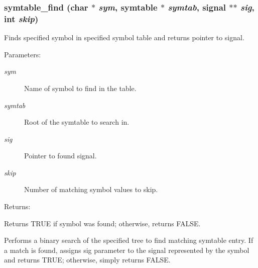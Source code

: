 \subsubsection{ symtable\_\-find (char $\ast$ {\em sym}, {\bf symtable} $\ast$ {\em symtab}, {\bf signal} $\ast$$\ast$ {\em sig}, int {\em skip})}\label{symtable_8h_a1}


Finds specified symbol in specified symbol table and returns pointer to signal.

\begin{Desc}
\item[Parameters: ]\par
\begin{description}
\item[{\em 
sym}]Name of symbol to find in the table. \item[{\em 
symtab}]Root of the symtable to search in. \item[{\em 
sig}]Pointer to found signal. \item[{\em 
skip}]Number of matching symbol values to skip.\end{description}
\end{Desc}
\begin{Desc}
\item[Returns: ]\par
Returns TRUE if symbol was found; otherwise, returns FALSE.\end{Desc}
Performs a binary search of the specified tree to find matching symtable entry. If a match is found, assigns sig parameter to the signal represented by the symbol and returns TRUE; otherwise, simply returns FALSE. 